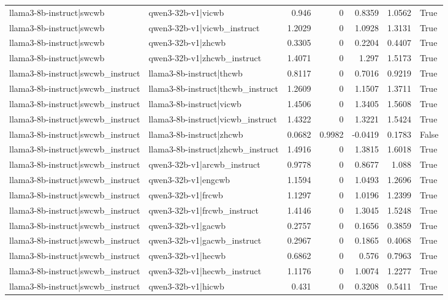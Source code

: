 \begin{table}
\begin{tabular}{l l r r r r l}
llama3-8b-instruct|swcwb & qwen3-32b-v1|vicwb & 0.946 & 0 & 0.8359 & 1.0562 & True \\
llama3-8b-instruct|swcwb & qwen3-32b-v1|vicwb_instruct & 1.2029 & 0 & 1.0928 & 1.3131 & True \\
llama3-8b-instruct|swcwb & qwen3-32b-v1|zhcwb & 0.3305 & 0 & 0.2204 & 0.4407 & True \\
llama3-8b-instruct|swcwb & qwen3-32b-v1|zhcwb_instruct & 1.4071 & 0 & 1.297 & 1.5173 & True \\
llama3-8b-instruct|swcwb_instruct & llama3-8b-instruct|thcwb & 0.8117 & 0 & 0.7016 & 0.9219 & True \\
llama3-8b-instruct|swcwb_instruct & llama3-8b-instruct|thcwb_instruct & 1.2609 & 0 & 1.1507 & 1.3711 & True \\
llama3-8b-instruct|swcwb_instruct & llama3-8b-instruct|vicwb & 1.4506 & 0 & 1.3405 & 1.5608 & True \\
llama3-8b-instruct|swcwb_instruct & llama3-8b-instruct|vicwb_instruct & 1.4322 & 0 & 1.3221 & 1.5424 & True \\
llama3-8b-instruct|swcwb_instruct & llama3-8b-instruct|zhcwb & 0.0682 & 0.9982 & -0.0419 & 0.1783 & False \\
llama3-8b-instruct|swcwb_instruct & llama3-8b-instruct|zhcwb_instruct & 1.4916 & 0 & 1.3815 & 1.6018 & True \\
llama3-8b-instruct|swcwb_instruct & qwen3-32b-v1|arcwb_instruct & 0.9778 & 0 & 0.8677 & 1.088 & True \\
llama3-8b-instruct|swcwb_instruct & qwen3-32b-v1|engcwb & 1.1594 & 0 & 1.0493 & 1.2696 & True \\
llama3-8b-instruct|swcwb_instruct & qwen3-32b-v1|frcwb & 1.1297 & 0 & 1.0196 & 1.2399 & True \\
llama3-8b-instruct|swcwb_instruct & qwen3-32b-v1|frcwb_instruct & 1.4146 & 0 & 1.3045 & 1.5248 & True \\
llama3-8b-instruct|swcwb_instruct & qwen3-32b-v1|gacwb & 0.2757 & 0 & 0.1656 & 0.3859 & True \\
llama3-8b-instruct|swcwb_instruct & qwen3-32b-v1|gacwb_instruct & 0.2967 & 0 & 0.1865 & 0.4068 & True \\
llama3-8b-instruct|swcwb_instruct & qwen3-32b-v1|hecwb & 0.6862 & 0 & 0.576 & 0.7963 & True \\
llama3-8b-instruct|swcwb_instruct & qwen3-32b-v1|hecwb_instruct & 1.1176 & 0 & 1.0074 & 1.2277 & True \\
llama3-8b-instruct|swcwb_instruct & qwen3-32b-v1|hicwb & 0.431 & 0 & 0.3208 & 0.5411 & True \\

\end{tabular}
\end{table}
